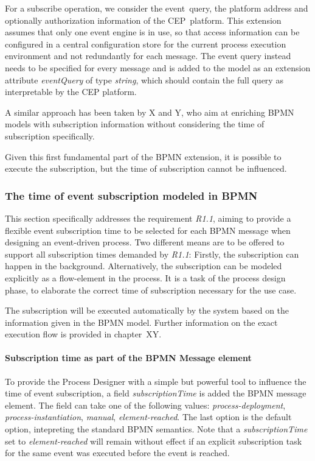 For a subscribe operation, we consider the event~query, the platform address and optionally authorization information of the CEP~platform.
This extension assumes that only one event engine is in use, so that access information can be configured in a central configuration store for the current process execution environment and not redundantly for each message.
The event query instead needs to be specified for every message and is added to the model as an extension attribute \textit{eventQuery} of type \textit{string}, which should contain the full query as interpretable by the CEP platform.

A similar approach has been taken by X and Y, who aim at enriching BPMN models with subscription information without considering the time of subscription specifically.

Given this first fundamental part of the BPMN extension, it is possible to execute the subscription, but the time of subscription cannot be influenced.

\subsubsection*{The time of event subscription modeled in BPMN}\label{ch:bpmnx:subscriptiontimes}

This section specifically addresses the requirement \textit{R1.1}, aiming to provide a flexible event subscription time to be selected for each BPMN message when designing an event-driven process.
Two different means are to be offered to support all subscription times demanded by \textit{R1.1}: Firstly, the subscription can happen in the background. Alternatively, the subscription can be modeled explicitly as a flow-element in the process.
It is a task of the process design phase, to elaborate the correct time of subscription necessary for the use case.

The subscription will be executed automatically by the system based on the information given in the BPMN model. Further information on the exact execution flow is provided in chapter~XY.



\paragraph{Subscription time as part of the BPMN Message element\newline}
To provide the Process Designer with a simple but powerful tool to influence the time of event subscription, a field \textit{subscriptionTime} is added the BPMN message element. 
The field can take one of the following values: \textit{process-deployment}, \textit{process-instantiation}, \textit{manual}, \textit{element-reached}. The last option is the default option, intepreting the standard BPMN semantics.
Note that a \textit{subscriptionTime} set to \textit{element-reached} will remain without effect if an explicit subscription task for the same event was executed before the event is reached.

